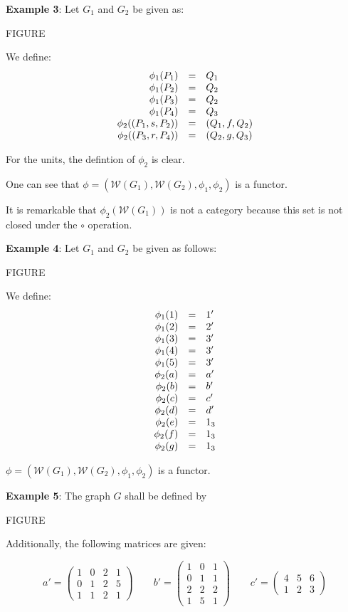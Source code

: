 {\bf Example 3}: Let $G_1$ and $G_2$ be given as:

FIGURE

We define: 
\[ \begin{array}{r@{\quad = \quad}l}
\phi_1(P_1) & Q_1 \\
\phi_1(P_2) & Q_2 \\
\phi_1(P_3) & Q_2 \\
\phi_1(P_4) & Q_3 \\
\phi_2((P_1, s, P_2)) & (Q_1, f, Q_2) \\
\phi_2((P_3, r, P_4)) & (Q_2, g, Q_3)
\end{array} \]

For the units, the defintion of $\phi_2$ is clear. 

One can see that $\phi = (\mathcal{W}(G_1), \mathcal{W}(G_2), \phi_1, \phi_2)$
is a functor.

It is remarkable that $\phi_2(\mathcal{W}(G_1))$ is not a category because this
set is not closed under the $\circ$ operation.

{\bf Example 4}: Let $G_1$ and $G_2$ be given as follows:

FIGURE

We define:
\[ \begin{array}{r@{\quad = \quad}l}
\phi_1(1) & 1' \\
\phi_1(2) & 2' \\
\phi_1(3) & 3' \\
\phi_1(4) & 3' \\
\phi_1(5) & 3' \\
\phi_2(a) & a' \\
\phi_2(b) & b' \\
\phi_2(c) & c' \\
\phi_2(d) & d' \\
\phi_2(e) & 1_3 \\
\phi_2(f) & 1_3 \\
\phi_2(g) & 1_3
\end{array} \]

$\phi = (\mathcal{W}(G_1), \mathcal{W}(G_2), \phi_1, \phi_2)$ is a functor.

{\bf Example 5}: The graph $G$ shall be defined by

FIGURE

Additionally, the following matrices are given:

\[
a' = \left( \begin{array}{cccc}
1 & 0 & 2 & 1 \\ 0 & 1 & 2 & 5 \\ 1 & 1 & 2 & 1
\end{array} \right)
\qquad 
b' = \left( \begin{array}{ccc}
1 & 0 & 1 \\ 0 & 1 & 1 \\ 2 & 2 & 2 \\ 1 & 5 & 1
\end{array} \right)
\qquad 
c' = \left( \begin{array}{ccc}
4 & 5 & 6 \\ 1 & 2 & 3
\end{array} \right)
\]

